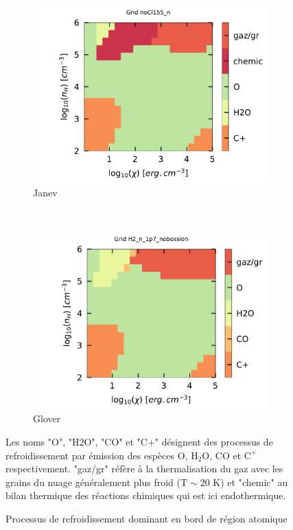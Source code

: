 \begin{figure}[!h]
    \begin{subfigure}[t]{0.49\textwidth} %
        \centering \includegraphics[trim = {0 0 0 1cm },clip,width=1\textwidth]{figure/H2/grid_janev/mapLmax.pdf}
        \caption{Janev}
    \end{subfigure}
    ~ 
    \begin{subfigure}[t]{0.49\textwidth}
        \centering \includegraphics[trim = {0 0 0 1cm },clip,width=1\textwidth]{figure/H2/grid_glover/mapLmax.pdf}
        \caption{Glover}
    \end{subfigure}
    \caption{Processus de refroidissement dominant en bord de région atomique}
    \begin{minipage}{\textwidth}
    Les noms "O", "H2O", "CO" et "C+" désignent des processus de refroidissement par émission des espèces $\mathrm{O}$, $\mathrm{H}_2\mathrm{O}$, $\mathrm{CO}$ et $\mathrm{C}^+$ respectivement. "gaz/gr" réfère à la thermalisation du gaz avec les grains du nuage généralement plus froid ($\mathrm{T}\sim20$ K) et "chemic" au bilan thermique des réactions chimiques qui est ici endothermique.
    \end{minipage}
    \label{fig:H2:JanevGlover:Lmax}
\end{figure}


